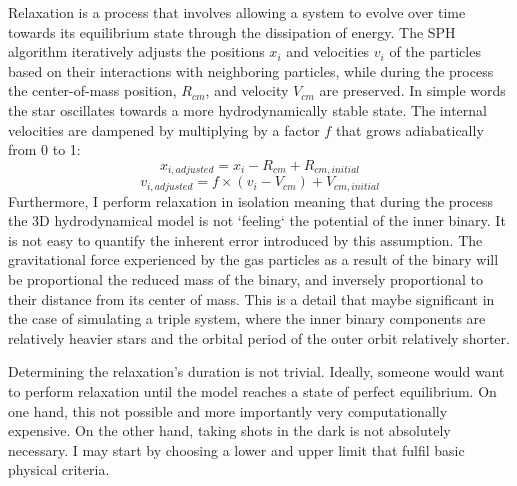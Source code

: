 Relaxation is a process that involves allowing a system to evolve over time towards its equilibrium state through the dissipation of energy. The SPH algorithm iteratively adjusts the positions $x_i$ and velocities $v_i$ of the particles based on their interactions with neighboring particles, while during the process the center-of-mass position, $R_{cm}$, and velocity $V_{cm}$ are preserved. In simple words the star oscillates towards a more hydrodynamically stable state. The internal velocities are dampened by multiplying by a factor $f$ that grows adiabatically from 0 to 1:
\begin{equation}\label{eq:adjust_positions}
    x_{i,adjusted} = x_i - R_{cm} + R_{cm,initial}
\end{equation}
\begin{equation}\label{eq:adjust_velocities}
    v_{i,adjusted} = f \times (v_i - V_{cm}) + V_{cm,initial}
\end{equation} 
Furthermore, I perform relaxation in isolation meaning that during the process the 3D hydrodynamical model is not `feeling` the potential of the inner binary. It is not easy to quantify the inherent error introduced by this assumption. The gravitational force experienced by the gas particles as a result of the binary will be proportional the reduced mass of the binary, and inversely proportional to their distance from its center of mass. This is a detail that maybe significant in the case of simulating a triple system, where the inner binary components are relatively heavier stars and the orbital period of the outer orbit relatively shorter.

Determining the relaxation's duration is not trivial. Ideally, someone would want to perform relaxation until the model reaches a state of perfect equilibrium. On one hand, this not possible and more importantly very computationally expensive. On the other hand, taking shots in the dark is not absolutely necessary. I may start by choosing a lower and upper limit that fulfil basic physical criteria.

